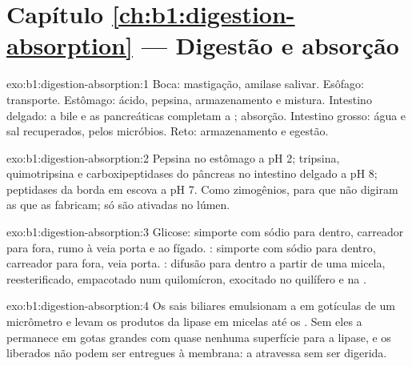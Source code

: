 \section*{Capítulo \ref{ch:b1:digestion-absorption} --- Digestão e absorção}

\begin{solution}{exo:b1:digestion-absorption:1}
Boca: mastigação, amilase salivar. Esôfago: transporte. Estômago:
ácido, pepsina, armazenamento e mistura. Intestino delgado: a bile e
as  pancreáticas completam a ; absorção. Intestino
grosso: água e sal recuperados,  pelos micróbios. Reto:
armazenamento e egestão.
\end{solution}

\begin{solution}{exo:b1:digestion-absorption:2}
Pepsina no estômago a pH 2; tripsina, quimotripsina e
carboxipeptidases do pâncreas no intestino delgado a pH 8; peptidases
da borda em escova a pH 7. Como zimogênios, para que não digiram as
 que as fabricam; só são ativadas no lúmen.
\end{solution}

\begin{solution}{exo:b1:digestion-absorption:3}
Glicose: simporte com sódio para dentro, carreador para fora, rumo à
veia porta e ao fígado. : simporte com sódio para dentro,
carreador para fora, veia porta. : difusão para dentro a
partir de uma micela, reesterificado, empacotado num quilomícron,
exocitado no quilífero e na .
\end{solution}

\begin{solution}{exo:b1:digestion-absorption:4}
Os sais biliares emulsionam a  em gotículas de um micrômetro e
levam os produtos da lipase em micelas até os . Sem eles a
 permanece em gotas grandes com quase nenhuma superfície para a
lipase, e os  liberados não podem ser entregues à
membrana: a  atravessa sem ser digerida.
\end{solution}

